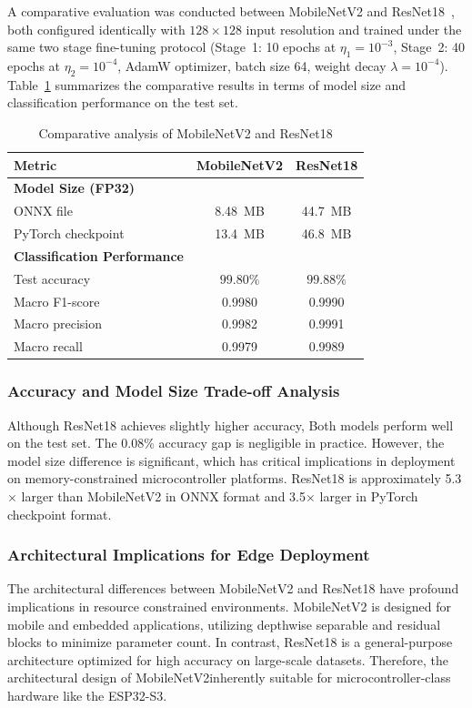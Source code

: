 A comparative evaluation was conducted between MobileNetV2 and ResNet18~\cite{he2016deep}, both configured identically with $128 \times 128$ input resolution and trained under the same two stage fine-tuning protocol (Stage~1: 10 epochs at $\eta_1 = 10^{-3}$, Stage~2: 40 epochs at $\eta_2 = 10^{-4}$, AdamW optimizer, batch size 64, weight decay $\lambda = 10^{-4}$). Table~\ref{tab:mobilenet_resnet_comparison} summarizes the comparative results in terms of model size and classification performance on the test set.

\begin{table}[htbp]
\centering
\caption{Comparative analysis of MobileNetV2 and ResNet18}
\label{tab:mobilenet_resnet_comparison}
\begin{tabular}{lcc}
\toprule
\textbf{Metric} & \textbf{MobileNetV2} & \textbf{ResNet18} \\
\midrule
\textbf{Model Size (FP32)} & & \\
\quad ONNX file & 8.48~MB & 44.7~MB \\
\quad PyTorch checkpoint & 13.4~MB & 46.8~MB \\
\midrule
\textbf{Classification Performance} & & \\
\quad Test accuracy & $99.80\%$ & $99.88\%$ \\
\quad Macro F1-score & 0.9980 & 0.9990 \\
\quad Macro precision & 0.9982 & 0.9991 \\
\quad Macro recall & 0.9979 & 0.9989 \\
\bottomrule
\end{tabular}
\end{table}

\subsubsection{Accuracy and Model Size Trade-off Analysis}

Although ResNet18 achieves slightly higher accuracy, Both models perform well on the test set. The 0.08\% accuracy gap is negligible in practice. However, the model size difference is significant, which has critical implications in deployment on memory-constrained microcontroller platforms. ResNet18 is approximately 5.3$\times$ larger than MobileNetV2 in ONNX format and 3.5$\times$ larger in PyTorch checkpoint format.


\subsubsection{Architectural Implications for Edge Deployment}
The architectural differences between MobileNetV2 and ResNet18 have profound implications in resource constrained environments. MobileNetV2 is designed for mobile and embedded applications, utilizing depthwise separable and residual blocks to minimize parameter count. In contrast, ResNet18 is a general-purpose architecture optimized for high accuracy on large-scale datasets. Therefore, the architectural design of MobileNetV2inherently suitable for microcontroller-class hardware like the ESP32-S3. 

